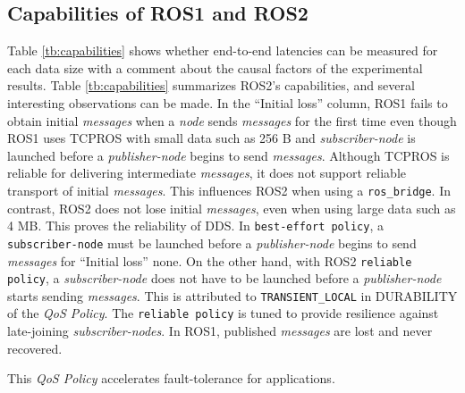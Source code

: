 \documentclass{sig-alternate-05-2015}
\begin{document}
\subsection{Capabilities of ROS1 and ROS2}
\label{sec:capacity}

Table \ref{tb:capabilities} shows whether end-to-end latencies can be measured for each data size with a comment about the causal factors of the experimental results.
Table \ref{tb:capabilities} summarizes ROS2's capabilities, and several interesting observations can be made.
In the ``Initial loss'' column, ROS1 fails to obtain initial \emph{messages} when a \emph{node} sends \emph{messages} for the first time even though ROS1 uses TCPROS with small data such as 256 B and \emph{subscriber-node} is launched before a \emph{publisher-node} begins to send \emph{messages}.
Although TCPROS is reliable for delivering intermediate \emph{messages}, it does not support reliable transport of initial \emph{messages}.
This influences ROS2 when using a \texttt{ros\_bridge}.
In contrast, ROS2 does not lose initial \emph{messages}, even when using large data such as 4 MB.
This proves the reliability of DDS.
In \texttt{best-effort policy}, a \texttt{subscriber-node} must be launched before a \emph{publisher-node} begins to send \emph{messages} for ``Initial loss'' none.
On the other hand, with ROS2 \texttt{reliable policy}, a \emph{subscriber-node} does not have to be launched before a \emph{publisher-node} starts sending \emph{messages}.
This is attributed to \texttt{TRANSIENT\_LOCAL} in DURABILITY of the \emph{QoS Policy}.
The \texttt{reliable policy} is tuned to provide resilience against late-joining \emph{subscriber-nodes}.
In ROS1, published \emph{messages} are lost and never recovered.

This \emph{QoS Policy} accelerates fault-tolerance for applications.
\end{document}
